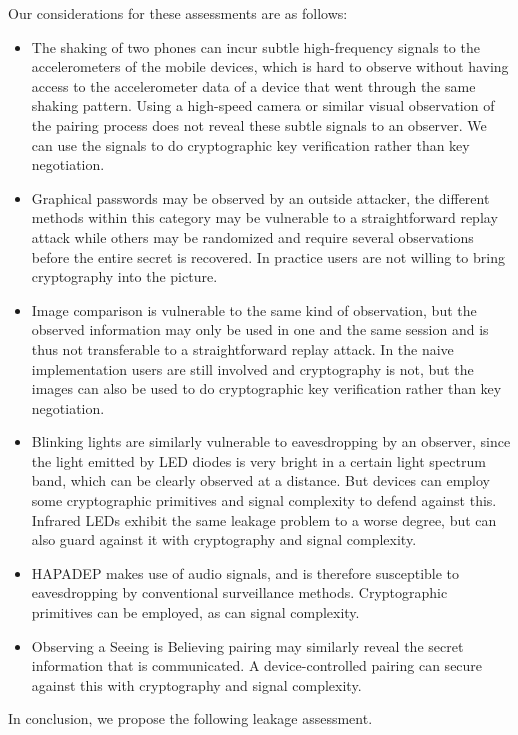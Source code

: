 \documentclass[conference, 12pt]{sty/IEEEtran}
\begin{document}
Our considerations for these assessments are as follows:
\begin{itemize}
	\item The shaking of two phones can incur subtle high-frequency signals to the accelerometers of the mobile devices, which is hard to observe without having access to the accelerometer data of a device that went through the same shaking pattern.
	Using a high-speed camera or similar visual observation of the pairing process does not reveal these subtle signals to an observer.
	We can use the signals to do cryptographic key verification rather than key negotiation.

	\item Graphical passwords may be observed by an outside attacker, the different methods within this category may be vulnerable to a straightforward replay attack while others may be randomized and require several observations before the entire secret is recovered. In practice users are not willing to bring cryptography into the picture.
	\item Image comparison is vulnerable to the same kind of observation, but the observed information may only be used in one and the same session and is thus not transferable to a straightforward replay attack.
	In the naive implementation users are still involved and cryptography is not, but the images can also be used to do cryptographic key verification rather than key negotiation.
	\item Blinking lights are similarly vulnerable to eavesdropping by an observer, since the light emitted by LED diodes is very bright in a certain light spectrum band, which can be clearly observed at a distance. But devices can employ some cryptographic primitives and signal complexity to defend against this.
	Infrared LEDs exhibit the same leakage problem to a worse degree, but can also guard against it with cryptography and signal complexity.
	\item HAPADEP makes use of audio signals, and is therefore susceptible to eavesdropping by conventional surveillance methods. Cryptographic primitives can be employed, as can signal complexity.
	\item Observing a Seeing is Believing pairing may similarly reveal the secret information that is communicated. A device-controlled pairing can secure against this with cryptography and signal complexity.
\end{itemize}

In conclusion, we propose the following leakage assessment.
\end{document}
